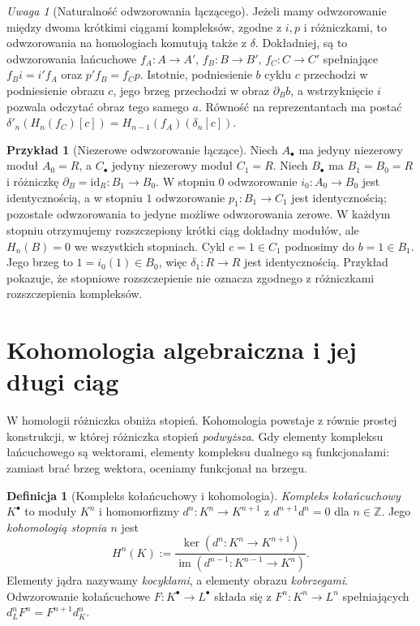 \documentclass[11pt,a4paper,oneside]{report}
\newcommand{\Z}{\mathbb{Z}}
\newcommand{\id}{\mathrm{id}}
\theoremstyle{plain}
\theoremstyle{definition}
\newtheorem{definicja}[twierdzenie]{Definicja}
\newtheorem{przyklad}[twierdzenie]{Przykład}
\theoremstyle{remark}
\newtheorem{uwaga}[twierdzenie]{Uwaga}
\begin{document}
\begin{uwaga}[Naturalność odwzorowania łączącego]
\label{uwaga:les-naturalnosc}
Jeżeli mamy odwzorowanie między dwoma krótkimi
ciągami kompleksów, zgodne z $i,p$ i
różniczkami, to odwzorowania na homologiach
komutują także z $\delta$.
Dokładniej, są to odwzorowania łańcuchowe
$f_A:A\to A'$, $f_B:B\to B'$, $f_C:C\to C'$ spełniające
$f_Bi=i'f_A$ oraz $p'f_B=f_Cp$.
Istotnie, podniesienie $b$ cyklu $c$ przechodzi
w podniesienie obrazu $c$, jego brzeg przechodzi
w obraz $\partial_Bb$, a wstrzyknięcie $i$
pozwala odczytać obraz tego samego $a$.
Równość na reprezentantach ma postać
$\delta'_n(H_n(f_C)[c])
=H_{n-1}(f_A)(\delta_n[c])$.
\end{uwaga}

\begin{przyklad}[Niezerowe odwzorowanie łączące]
\label{prz:delta-izomorfizm}
Niech $A_\bullet$ ma jedyny niezerowy moduł
$A_0=R$, a $C_\bullet$ jedyny niezerowy
moduł $C_1=R$. Niech $B_\bullet$ ma
$B_1=B_0=R$ i różniczkę
$\partial_B=\id_R:B_1\to B_0$.
W stopniu $0$ odwzorowanie $i_0:A_0\to B_0$
jest identycznością, a w stopniu $1$
odwzorowanie $p_1:B_1\to C_1$ jest identycznością;
pozostałe odwzorowania to jedyne możliwe odwzorowania zerowe.
W każdym stopniu otrzymujemy rozszczepiony
krótki ciąg dokładny modułów, ale
$H_n(B)=0$ we wszystkich stopniach.
Cykl $c=1\in C_1$ podnosimy do $b=1\in B_1$.
Jego brzeg to $1=i_0(1)\in B_0$,
więc $\delta_1:R\to R$ jest identycznością.
Przykład pokazuje, że stopniowe rozszczepienie
nie oznacza zgodnego z różniczkami
rozszczepienia kompleksów.
\end{przyklad}
\section{Kohomologia algebraiczna i jej długi ciąg}
\label{sec:kohomologia-algebraiczna}

W homologii różniczka obniża stopień.
Kohomologia powstaje z równie prostej
konstrukcji, w której różniczka stopień
\emph{podwyższa}. Gdy elementy kompleksu
łańcuchowego są wektorami, elementy
kompleksu dualnego są funkcjonałami:
zamiast brać brzeg wektora, oceniamy
funkcjonał na brzegu.

\begin{definicja}[Kompleks kołańcuchowy i kohomologia]
\label{def:kohomologia-algebraiczna}
\emph{Kompleks kołańcuchowy} $K^\bullet$ to
moduły $K^n$ i homomorfizmy
$d^n:K^n\to K^{n+1}$ z
$d^{n+1}d^n=0$ dla $n\in\Z$. Jego \emph{kohomologią stopnia $n$}
jest
\begin{equation}\label{eq:kohomologia-def}
 H^n(K):=\frac{\ker(d^n:K^n\to K^{n+1})}
 {\operatorname{im}(d^{n-1}:K^{n-1}\to K^n)}.
\end{equation}
Elementy jądra nazywamy \emph{kocyklami},
a elementy obrazu \emph{kobrzegami}.
Odwzorowanie kołańcuchowe $F:K^\bullet\to L^\bullet$
składa się z $F^n:K^n\to L^n$ spełniających
$d_L^nF^n=F^{n+1}d_K^n$.
\end{definicja}
\end{document}
